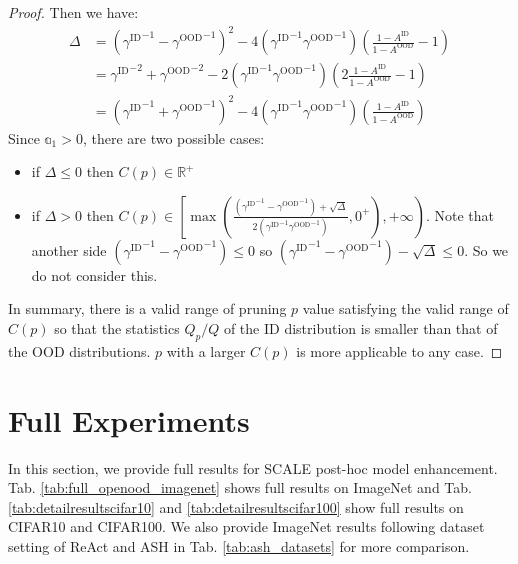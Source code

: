 \documentclass{article} %
\theoremstyle{plain}
\begin{document}
\begin{proof}
   Then we have:
   \begin{align}
    \Delta &= ({\gamma^{\text{ID}}}^{-1} -{\gamma^{\text{OOD}}}^{-1})^2 - 4({\gamma^{\text{ID}}}^{-1} {\gamma^{\text{OOD}}}^{-1})\left(\frac{1- A^{\text{ID}}}{1- A^{\text{OOD}}}- 1\right)\\
    &= {\gamma^{\text{ID}}}^{-2} +{\gamma^{\text{OOD}}}^{-2} - 2({\gamma^{\text{ID}}}^{-1} {\gamma^{\text{OOD}}}^{-1})\left(2\frac{1- A^{\text{ID}}}{1- A^{\text{OOD}}}- 1\right)\\
    &= \left( {\gamma^{\text{ID}}}^{-1} +{\gamma^{\text{OOD}}}^{-1} \right)^2 - 4({\gamma^{\text{ID}}}^{-1} {\gamma^{\text{OOD}}}^{-1})\left(\frac{1- A^{\text{ID}}}{1- A^{\text{OOD}}}\right)
    \end{align}
    Since $\mathbb{a}_1 > 0$, there are two possible cases:
    \begin{itemize}
        \item if $\Delta \leq 0$ then $C(p) \in \mathbb{R}^+$
        \item  if $\Delta > 0$ then $C(p) \in \left[ \max\left( \frac{({\gamma^{\text{ID}}}^{-1} -{\gamma^{\text{OOD}}}^{-1}) + \sqrt{\Delta}}{2({\gamma^{\text{ID}}}^{-1} {\gamma^{\text{OOD}}}^{-1})} , 0^+ \right),+\infty\right) $. Note that another side $({\gamma^{\text{ID}}}^{-1} -{\gamma^{\text{OOD}}}^{-1}) \leq 0$ so $({\gamma^{\text{ID}}}^{-1} -{\gamma^{\text{OOD}}}^{-1}) - \sqrt{\Delta} \leq 0$. So we do not consider this.
    \end{itemize}

    In summary, there is a valid range of pruning $p$ value satisfying the valid range of $C(p)$ so that the statistics $Q_p/Q$ of the ID distribution is smaller than that of the OOD distributions. $p$ with a larger $C(p)$ is more applicable to any case.
\end{proof}


\section{Full Experiments}\label{app:exps}
In this section, we provide full results for SCALE post-hoc model enhancement. Tab. \ref{tab:full_openood_imagenet} shows full results on ImageNet and Tab. \ref{tab:detailresultscifar10} and \ref{tab:detailresultscifar100} show full results on CIFAR10 and CIFAR100. We also provide ImageNet results following dataset setting of ReAct and ASH in Tab. \ref{tab:ash_datasets} for more comparison.
\end{document}
